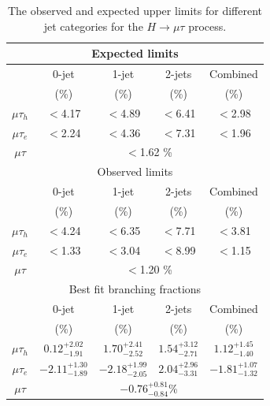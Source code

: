 \documentclass[oneside, letterpaper, oldfontcommands]{memoir}
\begin{document}
\begin{table}[hbtp]
 \centering
  \caption{The observed and expected upper limits for different
    jet categories for the $H \rightarrow \mu \tau$  process.}
 \label{tab:expected_limits13TeV}
\begin{tabular}{c|c|c|c|c} \hline
\multicolumn{5}{c}{Expected limits} \\ \hline
                       &  \multicolumn{1}{c|}{0-jet}   & \multicolumn{1}{c|}{1-jet}    &  \multicolumn{1}{c|}{2-jets} & \multicolumn{1}{c}{Combined}                 \\
                       & (\%)                     & (\%)                     & (\%)  &    (\%)                  \\   \cline{2-5}
          $\mu\tau_{h}$  & $<$4.17  & $<$4.89   & $<$6.41   &   $<$2.98   \\
      $\mu\tau_{e}$           & $<$2.24   &  $<$4.36  &  $<$7.31  &  $<$1.96    \\ \hline
            $\mu\tau$      &        \multicolumn{4}{c}{  $<$1.62  \% }                              \\ \hline \hline
\multicolumn{5}{c}{Observed limits} \\ \hline
                       &  \multicolumn{1}{c|}{0-jet}   & \multicolumn{1}{c|}{1-jet}    &  \multicolumn{1}{c|}{2-jets} & \multicolumn{1}{c}{Combined}                 \\
                       & (\%)                     & (\%)                     & (\%)  &    (\%)                  \\   \cline{2-5}
          $\mu\tau_{h}$  & $<$4.24  & $<$6.35   & $<$7.71   &   $<$3.81   \\
      $\mu\tau_{e}$           & $<$1.33   &  $<$3.04  &  $<$8.99  &  $<$1.15    \\ \hline
            $\mu\tau$      &        \multicolumn{4}{c}{  $<$1.20  \% }                              \\ \hline \hline
\multicolumn{5}{c}{Best fit branching fractions} \\ \hline
                       &  \multicolumn{1}{c|}{0-jet}   & \multicolumn{1}{c|}{1-jet}    &  \multicolumn{1}{c|}{2-jets} & \multicolumn{1}{c}{Combined}                 \\
                       & (\%)                     & (\%)                     & (\%)  &    (\%)                  \\   \cline{2-5}
      \rule[-5pt]{0pt}{17pt}
      $\mu\tau_{h}$  &  $0.12^{+2.02}_{-1.91}$  &  $1.70^{+2.41}_{-2.52}$  &  $1.54^{+3.12}_{-2.71}$  &   $1.12^{+1.45}_{-1.40}$   \\
      \rule[-5pt]{0pt}{17pt}
      $\mu\tau_{e}$    &  $-2.11^{+1.30}_{-1.89}$  &  $-2.18^{+1.99}_{-2.05}$  &  $2.04^{+2.96}_{-3.31}$ & $-1.81_{-1.32}^{+1.07}$  \\ \hline
      \rule[-5pt]{0pt}{17pt}
      $\mu\tau$  & \multicolumn{4}{c}{ $-0.76^{+0.81}_{-0.84}$\% }   \\ \hline
  \end{tabular}
\end{table}
\end{document}
